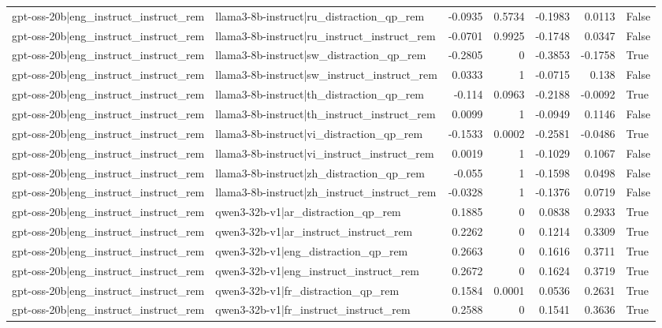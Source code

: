 \begin{table}
\begin{tabular}{l l r r r r l}
gpt-oss-20b|eng_instruct_instruct_rem & llama3-8b-instruct|ru_distraction_qp_rem & -0.0935 & 0.5734 & -0.1983 & 0.0113 & False \\
gpt-oss-20b|eng_instruct_instruct_rem & llama3-8b-instruct|ru_instruct_instruct_rem & -0.0701 & 0.9925 & -0.1748 & 0.0347 & False \\
gpt-oss-20b|eng_instruct_instruct_rem & llama3-8b-instruct|sw_distraction_qp_rem & -0.2805 & 0 & -0.3853 & -0.1758 & True \\
gpt-oss-20b|eng_instruct_instruct_rem & llama3-8b-instruct|sw_instruct_instruct_rem & 0.0333 & 1 & -0.0715 & 0.138 & False \\
gpt-oss-20b|eng_instruct_instruct_rem & llama3-8b-instruct|th_distraction_qp_rem & -0.114 & 0.0963 & -0.2188 & -0.0092 & True \\
gpt-oss-20b|eng_instruct_instruct_rem & llama3-8b-instruct|th_instruct_instruct_rem & 0.0099 & 1 & -0.0949 & 0.1146 & False \\
gpt-oss-20b|eng_instruct_instruct_rem & llama3-8b-instruct|vi_distraction_qp_rem & -0.1533 & 0.0002 & -0.2581 & -0.0486 & True \\
gpt-oss-20b|eng_instruct_instruct_rem & llama3-8b-instruct|vi_instruct_instruct_rem & 0.0019 & 1 & -0.1029 & 0.1067 & False \\
gpt-oss-20b|eng_instruct_instruct_rem & llama3-8b-instruct|zh_distraction_qp_rem & -0.055 & 1 & -0.1598 & 0.0498 & False \\
gpt-oss-20b|eng_instruct_instruct_rem & llama3-8b-instruct|zh_instruct_instruct_rem & -0.0328 & 1 & -0.1376 & 0.0719 & False \\
gpt-oss-20b|eng_instruct_instruct_rem & qwen3-32b-v1|ar_distraction_qp_rem & 0.1885 & 0 & 0.0838 & 0.2933 & True \\
gpt-oss-20b|eng_instruct_instruct_rem & qwen3-32b-v1|ar_instruct_instruct_rem & 0.2262 & 0 & 0.1214 & 0.3309 & True \\
gpt-oss-20b|eng_instruct_instruct_rem & qwen3-32b-v1|eng_distraction_qp_rem & 0.2663 & 0 & 0.1616 & 0.3711 & True \\
gpt-oss-20b|eng_instruct_instruct_rem & qwen3-32b-v1|eng_instruct_instruct_rem & 0.2672 & 0 & 0.1624 & 0.3719 & True \\
gpt-oss-20b|eng_instruct_instruct_rem & qwen3-32b-v1|fr_distraction_qp_rem & 0.1584 & 0.0001 & 0.0536 & 0.2631 & True \\
gpt-oss-20b|eng_instruct_instruct_rem & qwen3-32b-v1|fr_instruct_instruct_rem & 0.2588 & 0 & 0.1541 & 0.3636 & True \\

\end{tabular}
\end{table}
